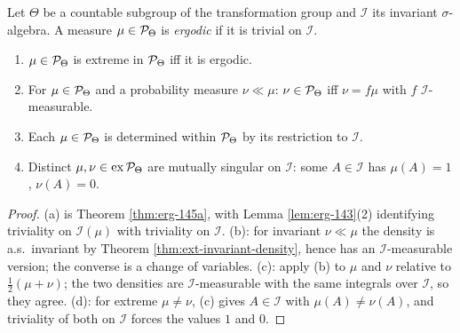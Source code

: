 \begin{theorem}
    \label{thm:erg-145}
    \leanok

    Let $\Theta$ be a countable subgroup of the transformation group and $\mathcal{I}$ its
    invariant $\sigma$-algebra. A measure $\mu \in \mathcal{P}_\Theta$ is \emph{ergodic} if it is
    trivial on $\mathcal{I}$.
    \begin{enumerate}
        \item[(a)] $\mu \in \mathcal{P}_\Theta$ is extreme in $\mathcal{P}_\Theta$ iff it is ergodic.
        \item[(b)] For $\mu \in \mathcal{P}_\Theta$ and a probability measure $\nu \ll \mu$:
              $\nu \in \mathcal{P}_\Theta$ iff $\nu = f\mu$ with $f$ $\mathcal{I}$-measurable.
        \item[(c)] Each $\mu \in \mathcal{P}_\Theta$ is determined within $\mathcal{P}_\Theta$ by its
              restriction to $\mathcal{I}$.
        \item[(d)] Distinct $\mu, \nu \in \mathrm{ex}\,\mathcal{P}_\Theta$ are mutually singular on
              $\mathcal{I}$: some $A \in \mathcal{I}$ has $\mu(A) = 1$, $\nu(A) = 0$.
    \end{enumerate}
\end{theorem}
\begin{proof}
    \leanok

    (a) is Theorem \ref{thm:erg-145a}, with Lemma \ref{lem:erg-143}(2) identifying triviality
    on $\mathcal{I}(\mu)$ with triviality on $\mathcal{I}$. (b): for invariant $\nu \ll \mu$ the
    density is a.s.\ invariant by Theorem \ref{thm:ext-invariant-density}, hence has an
    $\mathcal{I}$-measurable version; the converse is a change of variables. (c): apply (b) to
    $\mu$ and $\nu$ relative to $\frac12(\mu + \nu)$; the two densities are
    $\mathcal{I}$-measurable with the same integrals over $\mathcal{I}$, so they agree. (d): for
    extreme $\mu \neq \nu$, (c) gives $A \in \mathcal{I}$ with $\mu(A) \neq \nu(A)$, and
    triviality of both on $\mathcal{I}$ forces the values $1$ and $0$.
\end{proof}

